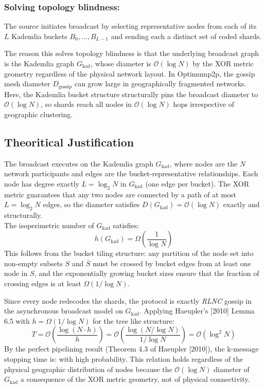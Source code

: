 \documentclass{article}
\begin{document}
\subsubsection*{Solving topology blindness:} 
The source initiates broadcast by selecting representative nodes from each of its $L$ Kademlia buckets $B_0, \ldots, B_{L-1}$ and sending each a distinct set of coded shards.

The reason this solves topology blindness is that the underlying broadcast graph is the Kademlia graph $G_\text{kad}$, whose diameter is $\mathcal{O}{(\log N)}$ by the XOR metric geometry regardless of the physical network layout. In Optimump2p, the gossip mesh diameter $D_\text{gossip}$ can grow large in geographically fragmented networks. Here, the Kademlia bucket structure structurally pins the broadcast diameter to $\mathcal{O}{(\log N)}$, so shards reach all nodes in $\mathcal{O}{(\log N)}$ hops irrespective of geographic clustering.

\subsection{Theoritical Justification}
The broadcast executes on the Kademlia graph $G_\text{kad}$, where nodes are the $N$ network participants and edges are the bucket-representative relationships. Each node has degree exactly $L = \log_2 N$ in $G_\text{kad}$ (one edge per bucket). The XOR metric guarantees that any two nodes are connected by a path of at most $L = \log_2 N$ edges, so the diameter satisfies $D(G_\text{kad}) = \mathcal{O}{(\log N)}$ exactly and structurally.\\
The isoperimetric number of $G_\text{kad}$ satisfies:
$$h(G_\text{kad}) = \Omega\!\left(\frac{1}{\log N}\right)$$
This follows from the bucket tiling structure: any partition of the node set into non-empty subsets $S$ and $\bar{S}$ must be crossed by bucket edges from at least one node in $S$, and the exponentially growing bucket sizes ensure that the fraction of crossing edges is at least $\Omega(1/\log N)$.

Since every node redecodes the shards, the protocol is exactly \textit{RLNC} gossip in the asynchronous broadcast model on $G_\text{kad}$.  Applying Haeupler's [2010] Lemma 6.5 with $h = \Omega(1/\log N)$ for the tree like structure:
\[
	T = \mathcal{O}{\!\left(\frac{\log(N \cdot h)}{h}\right)} = \mathcal{O}{\!\left(\frac{\log(N / \log N)}{1/\log N}\right)} = \mathcal{O}{(\log^2 N)}
\]
By the perfect pipelining result (Theorem 4.3 of Haeupler [2010]), the k-message stopping time is:
 with high probability. This relation holds regardless of the physical geographic distribution of nodes because the $\mathcal{O}{(\log N)}$ diameter of $G_\text{kad}$ a consequence of the XOR metric geometry, not of physical connectivity.
\end{document}
